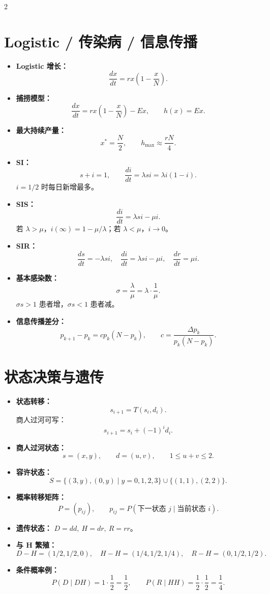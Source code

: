 \documentclass[UTF8,fontset=windows,10pt,a4paper]{ctexart}
\newcommand{\tagline}[1]{\textbf{\color{blue!60!black}#1：}}
\begin{document}
\begin{multicols}{2}
\section{Logistic / 传染病 / 信息传播}
\begin{itemize}
  \item \tagline{Logistic 增长}
  \[
    \frac{dx}{dt}=rx\left(1-\frac{x}{N}\right).
  \]
  \item \tagline{捕捞模型}
  \[
    \frac{dx}{dt}=rx\left(1-\frac{x}{N}\right)-Ex,\qquad h(x)=Ex.
  \]
  \item \tagline{最大持续产量}
  \[
    x^*=\frac N2,\qquad h_{\max}\approx \frac{rN}{4}.
  \]
  \item \tagline{SI}
  \[
    s+i=1,\qquad \frac{di}{dt}=\lambda si=\lambda i(1-i).
  \]
  $i=1/2$ 时每日新增最多。
  \item \tagline{SIS}
  \[
    \frac{di}{dt}=\lambda si-\mu i.
  \]
  若 $\lambda>\mu$，$i(\infty)=1-\mu/\lambda$；若 $\lambda<\mu$，$i\to0$。
  \item \tagline{SIR}
  \[
    \frac{ds}{dt}=-\lambda si,\quad
    \frac{di}{dt}=\lambda si-\mu i,\quad
    \frac{dr}{dt}=\mu i.
  \]
  \item \tagline{基本感染数}
  \[
    \sigma=\frac{\lambda}{\mu}=\lambda\cdot\frac1\mu.
  \]
  $\sigma s>1$ 患者增，$\sigma s<1$ 患者减。
  \item \tagline{信息传播差分}
  \[
    p_{k+1}-p_k=cp_k(N-p_k),\qquad
    c=\frac{\Delta p_k}{p_k(N-p_k)}.
  \]
\end{itemize}

\section{状态决策与遗传}
\begin{itemize}
  \item \tagline{状态转移}
  \[
    s_{i+1}=T(s_i,d_i).
  \]
  商人过河可写：
  \[
    s_{i+1}=s_i+(-1)^i d_i.
  \]
  \item \tagline{商人过河状态}
  \[
    s=(x,y),\qquad d=(u,v),\qquad 1\le u+v\le2.
  \]
  \item \tagline{容许状态}
  \[
    S=\{(3,y),(0,y)\mid y=0,1,2,3\}\cup\{(1,1),(2,2)\}.
  \]
  \item \tagline{概率转移矩阵}
  \[
    P=(p_{ij}),\qquad p_{ij}=P(\text{下一状态 }j\mid \text{当前状态 }i).
  \]
  \item \tagline{遗传状态} $D=dd,\ H=dr,\ R=rr$。
  \item \tagline{与 H 繁殖}
  \[
    D\!-\!H=(1/2,1/2,0),\quad
    H\!-\!H=(1/4,1/2,1/4),\quad
    R\!-\!H=(0,1/2,1/2).
  \]
  \item \tagline{条件概率例}
  \[
    P(D\mid DH)=1\cdot\frac12=\frac12,\qquad
    P(R\mid HH)=\frac12\cdot\frac12=\frac14.
  \]
\end{itemize}


\end{multicols}
\end{document}
